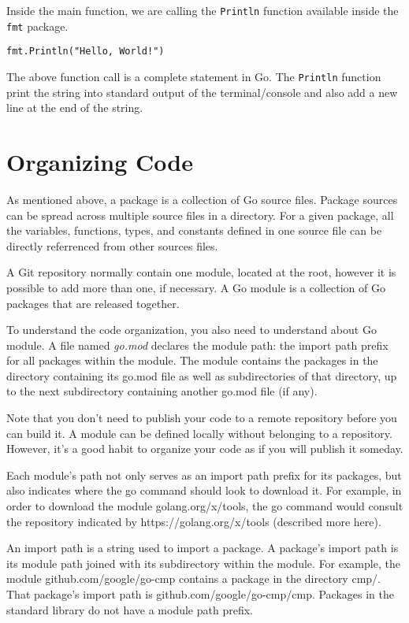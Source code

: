 Inside the main function, we are calling the \texttt{Println} function available
inside the \texttt{fmt} package.

\begin{lstlisting}[numbers=none]
fmt.Println("Hello, World!")
\end{lstlisting}

The above function call is a complete statement in Go.
The \texttt{Println} function print the string into standard output of
the terminal/console and also add a new line at the end of the string.

\section{Organizing Code}

As mentioned above, a package is a collection of Go source files. Package
sources can be spread across multiple source files in a directory. For a given
package, all the variables, functions, types, and constants defined in one
source file can be directly referrenced from other sources files.

A Git repository normally contain one module, located at the root, however it is
possible to add more than one, if necessary. A Go module is a collection of Go
packages that are released together.

To understand the code organization, you also need to understand about Go
module. A file named \textit{go.mod} declares the module path: the import path
prefix for all packages within the module. The module contains the packages in
the directory containing its go.mod file as well as subdirectories of that
directory, up to the next subdirectory containing another go.mod file (if any).

Note that you don't need to publish your code to a remote repository before you
can build it. A module can be defined locally without belonging to a repository.
However, it's a good habit to organize your code as if you will publish it
someday.

Each module's path not only serves as an import path prefix for its packages,
but also indicates where the go command should look to download it. For example,
in order to download the module golang.org/x/tools, the go command would consult
the repository indicated by https://golang.org/x/tools (described more here).

An import path is a string used to import a package. A package's import path is
its module path joined with its subdirectory within the module. For example, the
module github.com/google/go-cmp contains a package in the directory cmp/. That
package's import path is github.com/google/go-cmp/cmp. Packages in the standard
library do not have a module path prefix.

